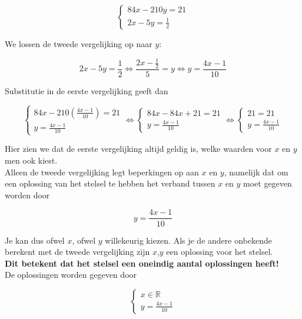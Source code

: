 \begin{voorbeeld}
	

\[\left\{ \begin{array}{l}
84x-210y=21\\
2x-5y = \frac{1}{2}
\end{array} \right.\]

We lossen de tweede vergelijking op naar $y$:

\[ 2x-5y = \frac{1}{2} \Leftrightarrow \frac{2x-\frac{1}{2}}{5}=y \Leftrightarrow y=\frac{4x-1}{10} \]

Substitutie in de eerste vergelijking geeft dan

\[\left\{ \begin{array}{l}
84x-210(\frac{4x-1}{10})=21 \\
y=\frac{4x-1}{10}
\end{array} \right. \Leftrightarrow \left\{ \begin{array}{l}
84x-84x+21=21 \\
y=\frac{4x-1}{10}
\end{array} \right. \Leftrightarrow \left\{ \begin{array}{l}
21=21\\
y=\frac{4x-1}{10}
\end{array} \right.\]

Hier zien we dat de eerste vergelijking altijd geldig is, welke waarden voor $x$ en $y$ men ook kiest.\\
Alleen de tweede vergelijking legt beperkingen op aan $x$ en $y$, namelijk dat om een oplossing van het stelsel te hebben het verband tussen $x$ en $y$ moet gegeven worden door

\[ y=\frac{4x-1}{10} \]

Je kan dus ofwel $x$, ofwel $y$ willekeurig kiezen. Als je de andere onbekende berekent met de tweede vergelijking zijn $x$,$y$ een oplossing voor het stelsel.\\

{\bf Dit betekent dat het stelsel een oneindig aantal oplossingen heeft!} \\

De oplossingen worden gegeven door

\[\left\{ \begin{array}{l}
x \in \mathbb{R} \\
y=\frac{4x-1}{10}
\end{array} \right. \]


\end{voorbeeld}

